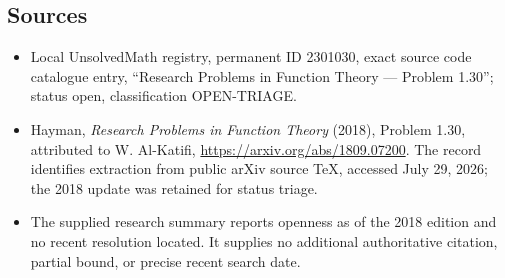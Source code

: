 \documentclass[11pt]{article}
\begin{document}
\subsection{Sources}
\begin{itemize}
\item Local UnsolvedMath registry, permanent ID 2301030, exact source code catalogue entry, ``Research Problems in Function Theory --- Problem 1.30''; status open, classification OPEN-TRIAGE.
\item Hayman, \emph{Research Problems in Function Theory} (2018), Problem 1.30, attributed to W. Al-Katifi, \url{https://arxiv.org/abs/1809.07200}. The record identifies extraction from public arXiv source TeX, accessed July 29, 2026; the 2018 update was retained for status triage.
\item The supplied research summary reports openness as of the 2018 edition and no recent resolution located. It supplies no additional authoritative citation, partial bound, or precise recent search date.
\end{itemize}
\end{document}
